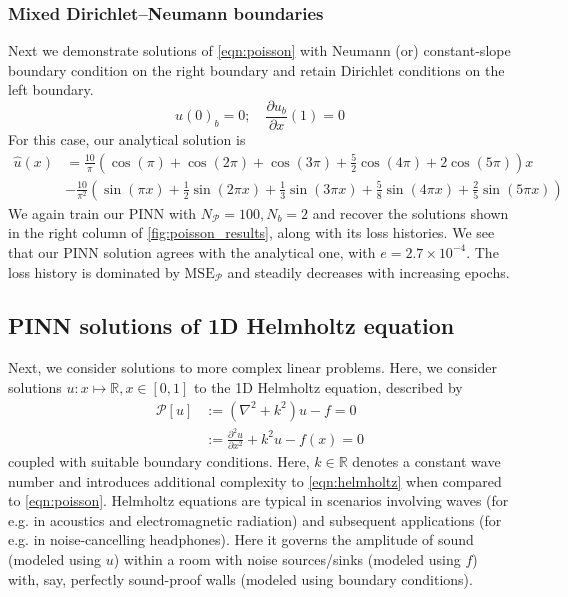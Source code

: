 \documentclass[11pt]{article}
\newcommand{\mse}{\textrm{MSE}}
\newcommand{\pde}{\ensuremath{\mathcal{P}}}
\begin{document}
\subsubsection{Mixed Dirichlet--Neumann boundaries}
\label{sec:orgf01a18e}
Next we demonstrate solutions of \cref{eqn:poisson} with Neumann (or)
constant-slope boundary condition on the right boundary and retain Dirichlet
conditions on the left boundary.
\[ u(0)_b = 0 ;\quad \frac{\partial u_b}{\partial x}(1) = 0\]
For this case, our analytical solution is
\begin{equation}
	\begin{aligned}
	 \hat{u}(x) &= \frac{10}{\pi}\left(\cos(\pi) + \cos(2\pi) + \cos(3\pi) + \frac{5}{2}\cos(4\pi) + 2\cos(5\pi)\right)x \\
	 & - \frac{10}{\pi^2} \left(\sin(\pi x) + \frac{1}{2}\sin(2\pi x) + \frac{1}{3}\sin(3\pi x) + \frac{5}{8}\sin(4\pi
	 x) + \frac{2}{5}\sin(5\pi x)\right)
	\end{aligned}
\end{equation}
We again train our PINN with \(N_\pde = 100 , N_b = 2\) and recover the solutions
shown in the right column of \cref{fig:poisson_results}, along with its loss
histories. We see that our PINN solution agrees with the analytical one,
with \(e = 2.7 \times 10^{-4}\). The loss history is dominated by \(\mse_\pde\) and steadily decreases with increasing epochs.

\subsection{PINN solutions of 1D Helmholtz equation}
\label{sec:helmholtz}
Next, we consider solutions to more complex linear problems. Here, we
consider solutions \(u : x \mapsto \mathbb{R}, x \in [0, 1]\) to the 1D Helmholtz equation, described by
\begin{equation}
\label{eqn:helmholtz}
\begin{aligned}
	\pde[ u ] &:= \left(\nabla^2 + k^2 \right) u - f = 0 \\
	   		  &:= \frac{\partial^2 u}{\partial x^2} + k^2 u - f(x) = 0
\end{aligned}
\end{equation}
coupled with suitable boundary conditions. Here, \(k \in \mathbb{R}\)
denotes a constant wave number and introduces additional
complexity to \cref{eqn:helmholtz} when compared to \cref{eqn:poisson}. Helmholtz equations
are typical in scenarios
involving waves (for e.g. in acoustics and electromagnetic radiation) and
subsequent applications (for e.g. in noise-cancelling headphones). Here
it governs the amplitude of sound (modeled using \(u\)) within a room with noise
sources/sinks (modeled using \(f\)) with, say, perfectly sound-proof walls
(modeled using boundary conditions).
\end{document}
